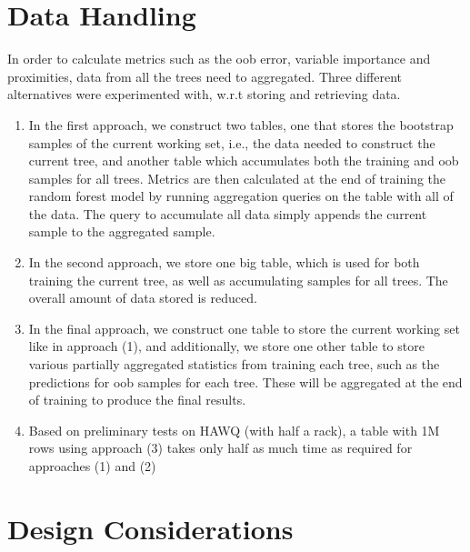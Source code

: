\section{Data Handling}
\label{sec:dataHandling}

In order to calculate metrics such as the oob error, variable importance and proximities, 
data from all the trees need to aggregated. Three different alternatives were 
experimented with, w.r.t storing and retrieving data.  

\begin{enumerate}
    \item In the first approach, we construct two tables, one that stores the bootstrap samples
    of the current working set, i.e., the data needed to construct the current tree, 
    and another table which accumulates both the training and oob samples for all trees.
    Metrics are then calculated at the end of training the random forest model by running
    aggregation queries on the table with all of the data. The query to accumulate all data 
    simply appends the current sample to the aggregated sample. 
    \item In the second approach, we store one big table, which is used for both training the 
    current tree, as well as accumulating samples for all trees. The overall amount of data 
    stored is reduced. 
    \item In the final approach, we construct one table to store the current working set like in
    approach (1), and additionally, we store one other table to store various partially 
    aggregated statistics from training each tree, such as the predictions for oob samples 
    for each tree. These will be aggregated at the end of training to produce the final results.   
    \item Based on preliminary tests on HAWQ (with half a rack), a table with 1M rows 
    using approach (3) takes only half as much time as required for approaches (1) and (2)
\end{enumerate}

\section{Design Considerations}
\label{sec:designConsiderations}

